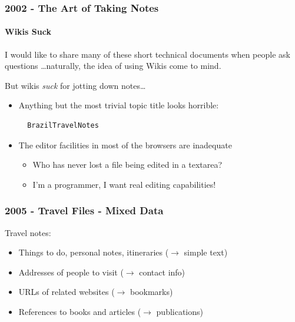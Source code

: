 \documentclass[compress,trans]{beamer}
\begin{document}
\begin{frame}[fragile]
  \frametitle{2002 - The Art of Taking Notes}
  \framesubtitle{Wikis Suck}

  I would like to share many of these short technical documents when people
  ask questions \dots naturally, the idea of using Wikis come to mind.

\vfill
  But wikis \emph{suck} for jotting down notes\dots

\begin{itemize}
\item Anything but the most trivial topic title looks horrible:

\begin{verbatim}
  BrazilTravelNotes
\end{verbatim}

\item The editor facilities in most of the browsers are inadequate
  \begin{itemize}
  \item Who has never lost a file being edited in a textarea?
  \item I'm a programmer, I want real editing capabilities!
  \end{itemize}
\end{itemize}

\vfill\pause


\end{frame}



\begin{frame}[fragile]
  \frametitle{2005 - Travel Files - Mixed Data}

Travel notes:
\begin{itemize}
\item Things to do, personal notes, itineraries ($\rightarrow$ simple text)
\item Addresses of people to visit ($\rightarrow$ contact info)
\item URLs of related websites ($\rightarrow$ bookmarks)
\item References to books and articles ($\rightarrow$ publications)
\end{itemize}



\end{frame}
\end{document}
